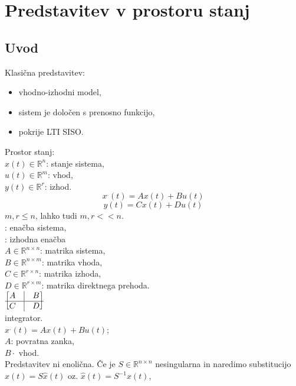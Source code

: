 \documentclass[a4paper, 12pt]{book}
\theoremstyle{definition}
\theoremstyle{remark}
\newcommand{\R}{\mathbb{R}}
\begin{document}

\chapter{Predstavitev v prostoru stanj}


\section{Uvod}

Klasična predstavitev:
\begin{itemize}
    \item vhodno-izhodni model,
    \item sistem je določen s prenosno funkcijo,
    \item pokrije LTI SISO.
\end{itemize}
Prostor stanj: \\
$x(t) \in \R^n$: stanje sistema, \\
$u(t) \in \R^m$: vhod, \\
$y(t) \in \R^r$: izhod.
\begin{equation}
    x^{.}(t) = Ax(t) + Bu(t)
    \label{eq:sistem-odvod}
\end{equation}
\begin{equation}
    y(t) = Cx(t) + Du(t)
    \label{eq:izhod}
\end{equation}
$m, r \leq n$, lahko tudi $m,r << n$. \\
: enačba sistema, \\
: izhodna enačba \\
$A \in \R^{n \times n}$: matrika sistema, \\
$B \in \R^{n \times m}$: matrika vhoda, \\
$C \in \R^{r \times n}$: matrika izhoda, \\
$D \in \R^{r \times m}$: matrika direktnega prehoda. \\
$\begin{bmatrix}
    A & \vline & B \\
    \hline
    C & \vline & D
\end{bmatrix}$ \\
integrator. \\
$x^{.}(t) = Ax(t) + Bu(t)$; \\
$A$: povratna zanka, \\
$B \cdot$ vhod. \\
Predstavitev ni enolična.
Če je $S \in \R^{n \times n}$ nesingularna in naredimo substitucijo $x(t) = S \hat{x}(t)$ oz. $\hat{x}(t) = S^{-1} x(t)$,
\end{document}
